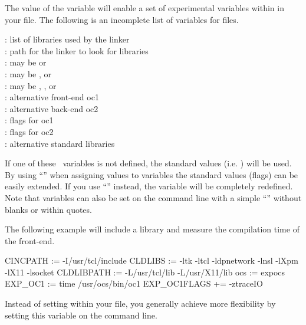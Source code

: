 The value  of the variable  will enable a set of
experimental variables within in your  file. 
The following is an incomplete list of  variables for
 files.

\begin{tabbing}
  : list of libraries used by the linker \\
  : path for the linker to look for libraries\\
 : may be  or \\
 : may be ,  or \\
 : may be , ,  or \\
 : alternative front-end oc1\\
 : alternative back-end oc2\\
 : flags for oc1\\
 : flags for oc2\\
 : alternative standard libraries
\end{tabbing}

If one of these \ variables is not defined, the standard values
(i.e. ) will be
used.  By using ``\pro{+=}'' when assigning values to variables the standard
values (flags) can be easily 
extended. If you use ``\pro{:=}'' instead, the variable will be completely
redefined. Note that variables can also be set on the command
line with a simple ``\pro{=}'' without blanks or within quotes. 

The following example will include a  library and measure the
compilation time of the front-end. 

\begin{prog}
  CINCPATH      := -I/usr/tcl/include 
  CLDLIBS       := -ltk -ltcl -ldpnetwork -lnsl -lXpm -lX11 -lsocket
  CLDLIBPATH    := -L/usr/tcl/lib -L/usr/X11/lib
  ocs := expocs
  EXP_OC1 := time /usr/ocs/bin/oc1
  EXP_OC1FLAGS += -ztraceIO
\end{prog}



Instead of setting  within your  file,
you generally achieve more flexibility by setting this variable on the
command line. 

